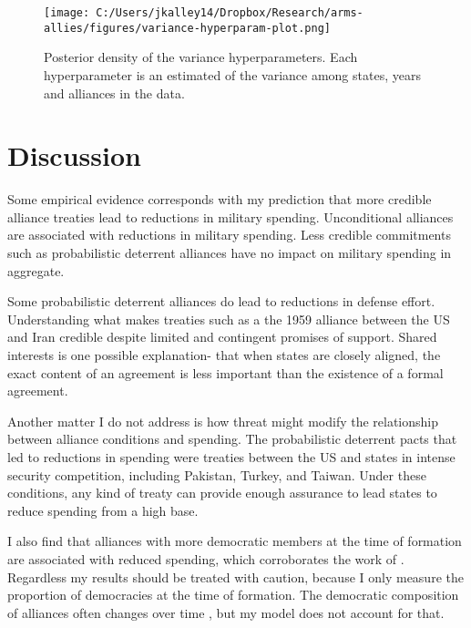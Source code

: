 \documentclass[12pt]{article}
\begin{document}
\begin{figure}[htbp]
	\centering
		\texttt{[image: C:/Users/jkalley14/Dropbox/Research/arms-allies/figures/variance-hyperparam-plot.png]}
	\caption{Posterior density of the variance hyperparameters. Each hyperparameter is an estimated of the variance among states, years and alliances in the data.}
	\label{fig:variance-hyperparam-plot}
\end{figure}


\section*{Discussion} 

Some empirical evidence corresponds with my prediction that more credible alliance treaties lead to reductions in military spending. Unconditional alliances are associated with reductions in military spending. Less credible commitments such as probabilistic deterrent alliances have no impact on military spending in aggregate. 

Some probabilistic deterrent alliances do lead to reductions in defense effort. Understanding what makes treaties such as a the 1959 alliance between the US and Iran credible despite limited and contingent promises of support. Shared interests is one possible explanation- that when states are closely aligned, the exact content of an agreement is less important than the existence of a formal agreement. 

Another matter I do not address is how threat might modify the relationship between alliance conditions and spending. The probabilistic deterrent pacts that led to reductions in spending were treaties between the US and states in intense security competition, including Pakistan, Turkey, and Taiwan. Under these conditions, any kind of treaty can provide enough assurance to lead states to reduce spending from a high base. 

I also find that alliances with more democratic members at the time of formation are associated with reduced spending, which corroborates the work of \citet{DigiuseppePoast2016}. Regardless my results should be treated with caution, because I only measure the proportion of democracies at the time of formation. The democratic composition of alliances often changes over time \citep{GiblerWolford2006}, but my model does not account for that. 
\end{document}
